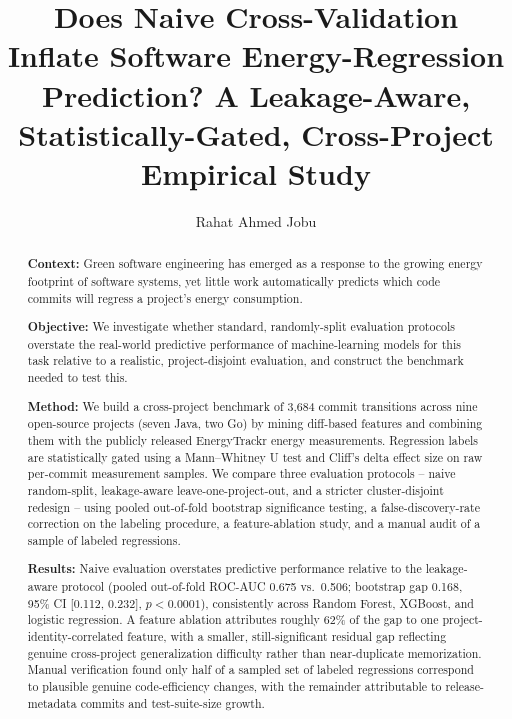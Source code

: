 \documentclass[preprint,12pt]{elsarticle}
\begin{document}
\begin{frontmatter}

\title{Does Naive Cross-Validation Inflate Software Energy-Regression Prediction? A Leakage-Aware, Statistically-Gated, Cross-Project Empirical Study}

\author[brac]{Rahat Ahmed Jobu}


\begin{abstract}
\textbf{Context:} Green software engineering has emerged as a response to the growing energy footprint of software systems, yet little work automatically predicts which code commits will regress a project's energy consumption.

\textbf{Objective:} We investigate whether standard, randomly-split evaluation protocols overstate the real-world predictive performance of machine-learning models for this task relative to a realistic, project-disjoint evaluation, and construct the benchmark needed to test this.

\textbf{Method:} We build a cross-project benchmark of 3{,}684 commit transitions across nine open-source projects (seven Java, two Go) by mining diff-based features and combining them with the publicly released EnergyTrackr energy measurements. Regression labels are statistically gated using a Mann--Whitney U test and Cliff's delta effect size on raw per-commit measurement samples. We compare three evaluation protocols -- naive random-split, leakage-aware leave-one-project-out, and a stricter cluster-disjoint redesign -- using pooled out-of-fold bootstrap significance testing, a false-discovery-rate correction on the labeling procedure, a feature-ablation study, and a manual audit of a sample of labeled regressions.

\textbf{Results:} Naive evaluation overstates predictive performance relative to the leakage-aware protocol (pooled out-of-fold ROC-AUC 0.675 vs.\ 0.506; bootstrap gap 0.168, 95\% CI [0.112, 0.232], $p<0.0001$), consistently across Random Forest, XGBoost, and logistic regression. A feature ablation attributes roughly 62\% of the gap to one project-identity-correlated feature, with a smaller, still-significant residual gap reflecting genuine cross-project generalization difficulty rather than near-duplicate memorization. Manual verification found only half of a sampled set of labeled regressions correspond to plausible genuine code-efficiency changes, with the remainder attributable to release-metadata commits and test-suite-size growth.


\end{abstract}
\end{frontmatter}
\end{document}

